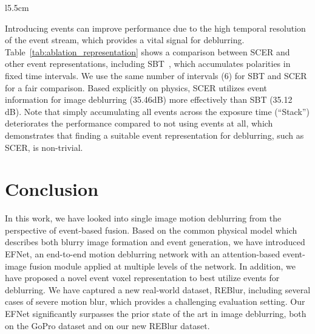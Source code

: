 \documentclass[runningheads]{llncs}
\newcommand{\PAR}[1]{\noindent{\bf #1}}
\newlength \g
\begin{document}
\begin{wraptable}{l}{5.5cm}
    \vspace{-20pt}
    \caption{\textbf{Comparison between different event representations} on the GoPro~\cite{nah2017deep} dataset. ``Stack'': temporal accumulation of events in a single channel.}
    \vspace{-10pt}
    \label{tab:ablation_representation}
    \vspace{-6mm}
\end{wraptable} 

\PAR{Event representation.} Introducing events can improve performance due to the high temporal resolution of the event stream, which provides a vital signal for deblurring. Table~\ref{tab:ablation_representation} shows a comparison between SCER and other event representations, including SBT~\cite{wang2019event}, which accumulates polarities in fixed time intervals. We use the same number of intervals (6) for SBT and SCER for a fair comparison. Based explicitly on physics, SCER utilizes event information for image deblurring (35.46dB) more effectively than SBT (35.12 dB). Note that simply accumulating all events across the exposure time (``Stack'') deteriorates the performance compared to not using events at all, which demonstrates that finding a suitable event representation for deblurring, such as SCER, is non-trivial.





\section{Conclusion}
\label{sec:conclusion}

In this work, we have looked into single image motion deblurring from the perspective of event-based fusion. Based on the common physical model which describes both blurry image formation and event generation, we have introduced EFNet, an end-to-end motion deblurring network with an attention-based event-image fusion module applied at multiple levels of the network. In addition, we have proposed a novel event voxel representation to best utilize events for deblurring. We have captured a new real-world dataset, REBlur, including several cases of severe motion blur, which provides a challenging evaluation setting. Our EFNet significantly surpasses the prior state of the art in image deblurring, both on the GoPro dataset and on our new REBlur dataset.
\end{document}
